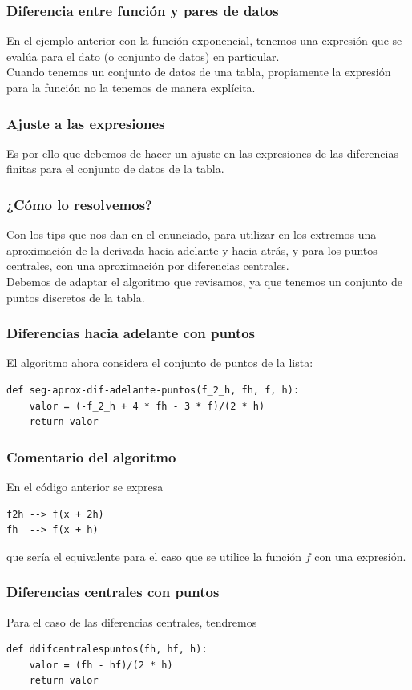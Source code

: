 \begin{frame}
\frametitle{Diferencia entre función y pares de datos}
En el ejemplo anterior con la función exponencial, tenemos una expresión que se evalúa para el dato (o conjunto de datos) en particular.
\\
\bigskip
Cuando tenemos un conjunto de datos de una tabla, propiamente la expresión para la función no la tenemos de manera explícita.
\end{frame}
\begin{frame}
\frametitle{Ajuste a las expresiones}
Es por ello que debemos de hacer un ajuste en las expresiones de las diferencias finitas para el conjunto de datos de la tabla.
\end{frame}
\begin{frame}
\frametitle{¿Cómo lo resolvemos?}
Con los tips que nos dan en el enunciado, para utilizar en los extremos una aproximación de la derivada hacia adelante y hacia atrás, y para los puntos centrales, con una aproximación por diferencias centrales.
\\
\bigskip
Debemos de adaptar el algoritmo que revisamos, ya que tenemos un conjunto de puntos discretos de la tabla.
\end{frame}
\begin{frame}[fragile]
\frametitle{Diferencias hacia adelante con puntos}
El algoritmo ahora considera el conjunto de puntos de la lista:
\begin{lstlisting}[caption=Algoritmo ajustado para el conjunto de puntos, style=FormattedNumber, basicstyle=\linespread{1.1}\ttfamily=\small, columns=fullflexible]
def seg-aprox-dif-adelante-puntos(f_2_h, fh, f, h):
    valor = (-f_2_h + 4 * fh - 3 * f)/(2 * h)
    return valor
\end{lstlisting}
\end{frame}
\begin{frame}[fragile]
\frametitle{Comentario del algoritmo}
En el código anterior se expresa
\begin{verbatim}
f2h --> f(x + 2h)
fh  --> f(x + h)
\end{verbatim}
que sería el equivalente para el caso que se utilice la función $f$ con una expresión.
\end{frame}
\begin{frame}[fragile]
\frametitle{Diferencias centrales con puntos}
Para el caso de las diferencias centrales, tendremos
\begin{lstlisting}[caption=Algoritmo ajustado para el conjunto de puntos, style=FormattedNumber, basicstyle=\linespread{1.1}\ttfamily=\small, columns=fullflexible]
def ddifcentralespuntos(fh, hf, h):
    valor = (fh - hf)/(2 * h)
    return valor
\end{lstlisting}
\end{frame}
